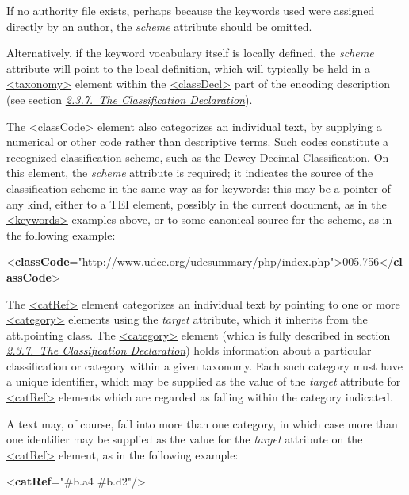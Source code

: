 If no authority file exists, perhaps because the keywords used were assigned directly by an author, the {\itshape scheme} attribute should be omitted.\par
Alternatively, if the keyword vocabulary itself is locally defined, the {\itshape scheme} attribute will point to the local definition, which will typically be held in a \hyperref[TEI.taxonomy]{<taxonomy>} element within the \hyperref[TEI.classDecl]{<classDecl>} part of the encoding description (see section \textit{\hyperref[HD55]{2.3.7.\ The Classification Declaration}}).    \par
The \hyperref[TEI.classCode]{<classCode>} element also categorizes an individual text, by supplying a numerical or other code rather than descriptive terms. Such codes constitute a recognized classification scheme, such as the Dewey Decimal Classification. On this element, the {\itshape scheme} attribute is required; it indicates the source of the classification scheme in the same way as for keywords: this may be a pointer of any kind, either to a TEI element, possibly in the current document, as in the \hyperref[TEI.keywords]{<keywords>} examples above, or to some canonical source for the scheme, as in the following example: \par\bgroup{}\exampleFont \begin{shaded}\noindent\mbox{}{<\textbf{classCode}\hspace*{1em}{scheme}="{http://www.udcc.org/udcsummary/php/index.php}">}005.756{</\textbf{classCode}>}\end{shaded}\egroup\par \par
The \hyperref[TEI.catRef]{<catRef>} element categorizes an individual text by pointing to one or more \hyperref[TEI.category]{<category>} elements using the {\itshape target} attribute, which it inherits from the \textsf{att.pointing} class. The \hyperref[TEI.category]{<category>} element (which is fully described in section \textit{\hyperref[HD55]{2.3.7.\ The Classification Declaration}}) holds information about a particular classification or category within a given taxonomy. Each such category must have a unique identifier, which may be supplied as the value of the {\itshape target} attribute for \hyperref[TEI.catRef]{<catRef>} elements which are regarded as falling within the category indicated.\par
A text may, of course, fall into more than one category, in which case more than one identifier may be supplied as the value for the {\itshape target} attribute on the \hyperref[TEI.catRef]{<catRef>} element, as in the following example: \par\bgroup{}\exampleFont \begin{shaded}\noindent\mbox{}{<\textbf{catRef}\hspace*{1em}{target}="{\#b.a4 \#b.d2}"/>}\end{shaded}\egroup\par \par

